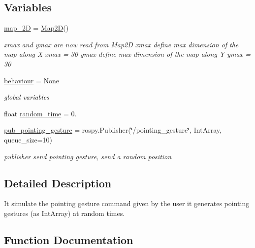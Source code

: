 \subsection*{Variables}
\begin{DoxyCompactItemize}
\item 
\hyperlink{namespacepointing__gesture_a08e4083045796d171c79d2538f1b9948}{map\+\_\+2D} = \hyperlink{classmap2Dclass_1_1Map2D}{Map2D}()
\begin{DoxyCompactList}\small\item\em xmax and ymax are now read from Map2D xmax define max dimension of the map along X xmax = 30 ymax define max dimension of the map along Y ymax = 30 \end{DoxyCompactList}\item 
\hyperlink{namespacepointing__gesture_a16dc32bb0bc4ae96f247e60f4671e69f}{behaviour} = None
\begin{DoxyCompactList}\small\item\em global variables \end{DoxyCompactList}\item 
float \hyperlink{namespacepointing__gesture_a5368d56de06c11e03076a319bb31d276}{random\+\_\+time} = 0.
\item 
\hyperlink{namespacepointing__gesture_a0a5243d3050e55cb47090bcfece22c5d}{pub\+\_\+pointing\+\_\+gesture} = rospy.\+Publisher(\char`\"{}/pointing\+\_\+gesture\char`\"{}, Int\+Array, queue\+\_\+size=10)
\begin{DoxyCompactList}\small\item\em publisher send pointing gesture, send a random position \end{DoxyCompactList}\end{DoxyCompactItemize}


\subsection{Detailed Description}
It simulate the pointing gesture command given by the user it generates pointing gestures (as Int\+Array) at random times. 

\subsection{Function Documentation}
